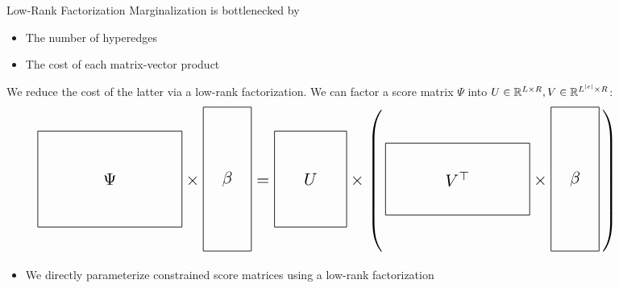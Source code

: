 \documentclass{beamer}
\newlength{\onecolwid}
\begin{document}
\begin{frame}
\begin{columns}[t]
\begin{column}{\onecolwid}
\begin{block}{Low-Rank Factorization}
Marginalization is bottlenecked by
\begin{itemize}
\item The number of hyperedges
\item The cost of each matrix-vector product
\end{itemize}
We reduce the cost of the latter via a low-rank factorization.
We can factor a score matrix $\Psi$ into 
$U\in\mathbb{R}^{L \times R},V\in\mathbb{R}^{L^{|e|}\times R}$:
\[
\scalebox{1.5}{
$
\vcenter{\hbox{\begin{tikzpicture}[baseline=-0.5ex]
    \draw (0,0) rectangle (3,2) node[pos=.5] {$\Psi$};
\end{tikzpicture}}}
\times
\vcenter{\hbox{\begin{tikzpicture}[baseline=-0.5ex]
    \draw (0,0) rectangle (1,3) node[pos=.5] {$\beta$};
\end{tikzpicture}}}
=
\vcenter{\hbox{\begin{tikzpicture}[baseline=-0.5ex]
    \draw (0,0) rectangle (1.5,2) node[pos=.5] {$U$};
\end{tikzpicture}}}
\times
\left(\,
\vcenter{\hbox{\begin{tikzpicture}[baseline=-0.5ex]
    \draw (0,0) rectangle (3,1.5) node[pos=.5] {$V^\top$};
\end{tikzpicture}}}
\times
\vcenter{\hbox{\begin{tikzpicture}[baseline=-0.5ex]
    \draw (0,0) rectangle (1,3) node[pos=.5] {$\beta$};
\end{tikzpicture}}}
\,\right)
$
}
\]
\begin{itemize}
\item We directly parameterize constrained score matrices
    using a low-rank factorization
\end{itemize}

\end{block}


\end{column} %

\begin{column}{\onecolwid} %



\end{column}
\end{columns}
\end{frame}
\end{document}

